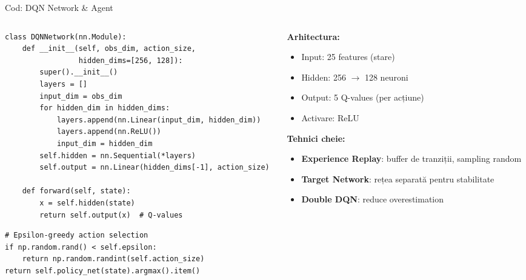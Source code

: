 \documentclass[aspectratio=169]{beamer}
\begin{document}
\begin{frame}[fragile]{Cod: DQN Network \& Agent}
  \begin{columns}
    \begin{column}{0.52\textwidth}
      \begin{lstlisting}[style=pythonstyle]
class DQNNetwork(nn.Module):
    def __init__(self, obs_dim, action_size, 
                 hidden_dims=[256, 128]):
        super().__init__()
        layers = []
        input_dim = obs_dim
        for hidden_dim in hidden_dims:
            layers.append(nn.Linear(input_dim, hidden_dim))
            layers.append(nn.ReLU())
            input_dim = hidden_dim
        self.hidden = nn.Sequential(*layers)
        self.output = nn.Linear(hidden_dims[-1], action_size)

    def forward(self, state):
        x = self.hidden(state)
        return self.output(x)  # Q-values
      \end{lstlisting}
      
      \vspace{0.2cm}
      \begin{lstlisting}[style=pythonstyle]
# Epsilon-greedy action selection
if np.random.rand() < self.epsilon:
    return np.random.randint(self.action_size)
return self.policy_net(state).argmax().item()
      \end{lstlisting}
    \end{column}
    \begin{column}{0.45\textwidth}
      \textbf{Arhitectura:}
      \begin{itemize}
        \item Input: 25 features (stare)
        \item Hidden: 256 $\to$ 128 neuroni
        \item Output: 5 Q-values (per acțiune)
        \item Activare: ReLU
      \end{itemize}
      
      \vspace{0.3cm}
      \textbf{Tehnici cheie:}
      \begin{itemize}
        \item \textbf{Experience Replay}: buffer de tranziții, sampling random
        \item \textbf{Target Network}: rețea separată pentru stabilitate
        \item \textbf{Double DQN}: reduce overestimation
      \end{itemize}
    \end{column}
  \end{columns}
\end{frame}
\end{document}

